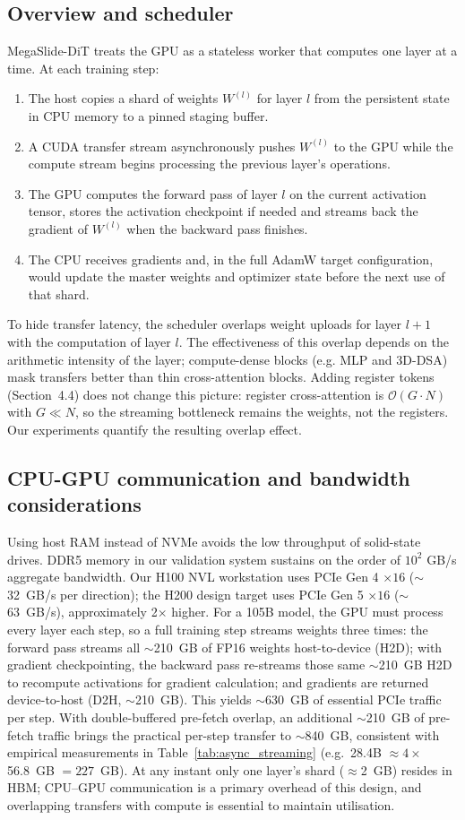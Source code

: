 \documentclass[11pt, letterpaper]{article}
\begin{document}
\subsection{Overview and scheduler}
MegaSlide-DiT treats the GPU as a stateless worker that computes one layer at a time. At each training step:
\begin{enumerate}
    \item The host copies a shard of weights $W^{(l)}$ for layer $l$ from the persistent state in CPU memory to a pinned staging buffer.
    \item A CUDA transfer stream asynchronously pushes $W^{(l)}$ to the GPU while the compute stream begins processing the previous layer’s operations.
    \item The GPU computes the forward pass of layer $l$ on the current activation tensor, stores the activation checkpoint if needed and streams back the gradient of $W^{(l)}$ when the backward pass finishes.
    \item The CPU receives gradients and, in the full AdamW target configuration, would update the master weights and optimizer state before the next use of that shard.
\end{enumerate}
To hide transfer latency, the scheduler overlaps weight uploads for layer $l+1$ with the computation of layer $l$. The effectiveness of this overlap depends on the arithmetic intensity of the layer; compute-dense blocks (e.g. MLP and 3D-DSA) mask transfers better than thin cross-attention blocks. Adding register tokens (Section~4.4) does not change this picture: register cross-attention is $\mathcal{O}(G\cdot N)$ with $G \ll N$, so the streaming bottleneck remains the weights, not the registers. Our experiments quantify the resulting overlap effect.

\subsection{CPU-GPU communication and bandwidth considerations}
Using host RAM instead of NVMe avoids the low throughput of solid-state drives. DDR5 memory in our validation system sustains on the order of $10^2$ GB/s aggregate bandwidth. Our H100 NVL workstation uses PCIe Gen 4 $\times16$ ($\sim$32~GB/s per direction); the H200 design target uses PCIe Gen 5 $\times16$ ($\sim$63~GB/s), approximately 2$\times$ higher. For a 105B model, the GPU must process every layer each step, so a full training step streams weights three times: the forward pass streams all $\sim$210~GB of FP16 weights host-to-device (H2D); with gradient checkpointing, the backward pass re-streams those same $\sim$210~GB H2D to recompute activations for gradient calculation; and gradients are returned device-to-host (D2H, $\sim$210~GB). This yields $\sim$630~GB of essential PCIe traffic per step. With double-buffered pre-fetch overlap, an additional $\sim$210~GB of pre-fetch traffic brings the practical per-step transfer to $\sim$840~GB, consistent with empirical measurements in Table~\ref{tab:async_streaming} (e.g.\ 28.4B $\approx 4\times$56.8~GB $= 227$~GB). At any instant only one layer's shard ($\approx$2~GB) resides in HBM; CPU--GPU communication is a primary overhead of this design, and overlapping transfers with compute is essential to maintain utilisation.
\end{document}
